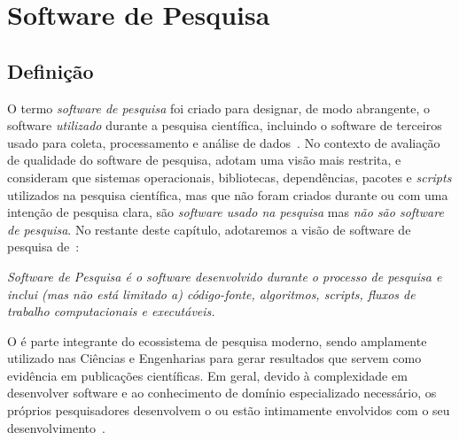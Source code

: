 \section{Software de Pesquisa}
\label{section:researchsoftware}

\subsection{Definição}

O termo \textit{software de pesquisa} foi criado para designar, de modo abrangente, o software \textit{utilizado} durante a pesquisa científica, incluindo o software de terceiros usado para coleta, processamento e análise de dados~\cite{allen_et_al:DM:2017:7146}.
%
%
No contexto de avaliação de qualidade do software de pesquisa,
\cite{gruenpeter_morane_2021_5504016} adotam uma visão mais restrita, e consideram que sistemas operacionais, bibliotecas, dependências, pacotes e \textit{scripts} utilizados na pesquisa científica, mas que não foram criados durante ou com uma intenção de pesquisa clara, são \textit{software usado na pesquisa} mas \textit{não são software de pesquisa}.
%
No restante deste capítulo, adotaremos a visão de software de pesquisa de~\cite{gruenpeter_morane_2021_5504016}: 

\textit{Software de Pesquisa é o software desenvolvido durante o processo de pesquisa e inclui (mas não está limitado a) código-fonte, algoritmos, \textit{scripts}, fluxos de trabalho computacionais e executáveis.} 


O \RSw é parte integrante do ecossistema de pesquisa moderno,
sendo amplamente utilizado nas Ciências e Engenharias para gerar resultados que servem como evidência em publicações científicas. 
Em geral, devido à complexidade em desenvolver software e ao conhecimento de domínio especializado necessário, os próprios pesquisadores desenvolvem o \RSw ou estão intimamente envolvidos com o seu desenvolvimento~\cite{carver:icse:2007}.

